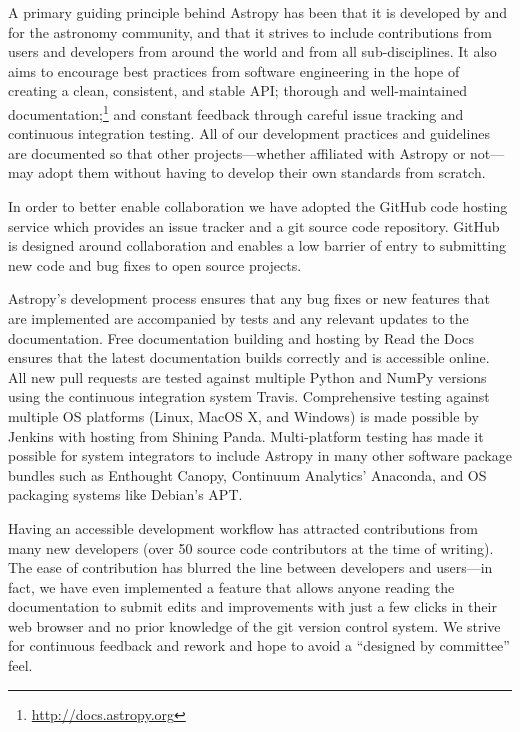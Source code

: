 \documentclass[11pt,twoside]{article}
\begin{document}
A primary guiding principle behind Astropy has been that it is developed by and
for the astronomy community, and that it strives to include contributions from
users and developers from around the world and from all sub-disciplines.  It
also aims to encourage best practices from software engineering in the hope of
creating a clean, consistent, and stable API; thorough and well-maintained
documentation;\footnote{\url{http://docs.astropy.org}} and constant feedback
through careful issue tracking and continuous integration testing.  All of our
development practices and guidelines are documented so that other
projects---whether affiliated with Astropy or not---may adopt them without
having to develop their own standards from scratch.

In order to better enable collaboration we have adopted the GitHub code hosting
service which provides an issue tracker and a git source code repository.
GitHub is designed around collaboration and enables a low barrier of entry to
submitting new code and bug fixes to open source projects.

Astropy's development process ensures that any bug fixes or new features that
are implemented are accompanied by tests and any relevant updates to the
documentation.  Free documentation building and hosting by Read the Docs
ensures that the latest documentation builds correctly and is accessible
online.  All new pull requests are tested against multiple Python and NumPy
versions using the continuous integration system Travis.  Comprehensive testing
against multiple OS platforms (Linux, MacOS X, and Windows) is made possible by
Jenkins with hosting from Shining Panda.  Multi-platform testing has made it
possible for system integrators to include Astropy in many other software
package bundles such as Enthought Canopy, Continuum Analytics' Anaconda, and OS
packaging systems like Debian's APT.

Having an accessible development workflow has attracted contributions from many
new developers (over 50 source code contributors at the time of writing).  The
ease of contribution has blurred the line between developers and users---in
fact, we have even implemented a feature that allows anyone reading the
documentation to submit edits and improvements with just a few clicks in their
web browser and no prior knowledge of the git version control system.  We
strive for continuous feedback and rework and hope to avoid a ``designed by
committee'' feel.


\end{document}
